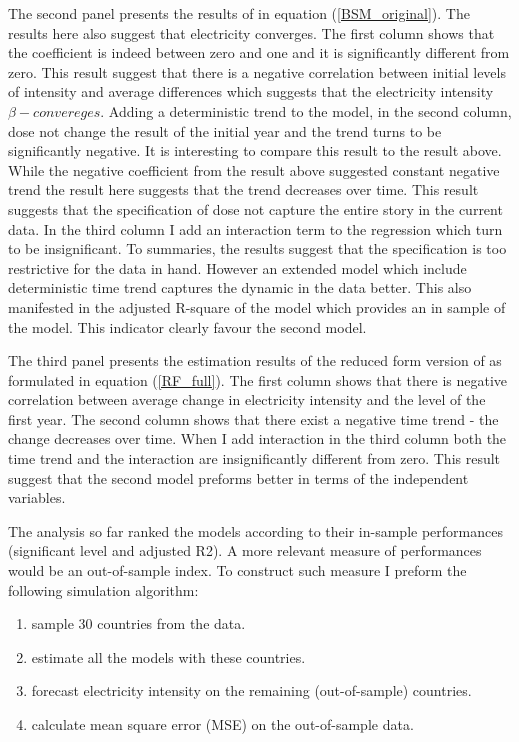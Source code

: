 \documentclass[]{amsart}
\begin{document}
The second panel presents the results of \cite{barro1992convergence} in equation (\ref{BSM_original}). The results here also suggest that electricity converges. The first column shows that the coefficient is indeed between zero and one and it is significantly different from zero. This result suggest that there is a negative correlation between initial levels of intensity and average differences which suggests that the electricity intensity $\beta-convereges$. Adding a deterministic trend to the model, in the second column, dose not change the result of the initial year and the trend turns to be significantly negative. It is interesting to compare this result to the result above. While the negative coefficient from the result above suggested constant negative trend the result here suggests that the trend decreases over time. This result suggests that the specification of \cite{barro1992convergence} dose not capture the entire story in the current data. In the third column I add an interaction term to the regression which turn to be insignificant. To summaries, the results suggest that the \cite{barro1992convergence} specification is too restrictive for the data in hand. However an extended model which include deterministic time trend captures the dynamic in the data better. This also manifested in the adjusted R-square of the model which provides an in sample of the model. This indicator clearly favour the second model.

\bigskip

The third panel presents the estimation results of the reduced form version of \cite{barro1992convergence} as formulated in equation (\ref{RF_full}). The first column shows that there is negative correlation between average change in electricity intensity and the level of the first year. The second column shows that there exist a negative time trend - the change decreases over time. When I add interaction in the third column both the time trend and the interaction are insignificantly different from zero. This result suggest that the second model preforms better in terms of the independent variables.

\bigskip

The analysis so far ranked the models according to their in-sample performances (significant level and adjusted R2). A more relevant measure of performances would be an out-of-sample index. To construct such measure I preform the following simulation algorithm:

\bigskip

\begin{enumerate}
\item sample 30 countries from the data.
\item estimate all the models with these countries. 
\item forecast electricity intensity on the remaining (out-of-sample) countries.
\item calculate mean square error (MSE) on the out-of-sample data. 
\end{enumerate}
\end{document}
